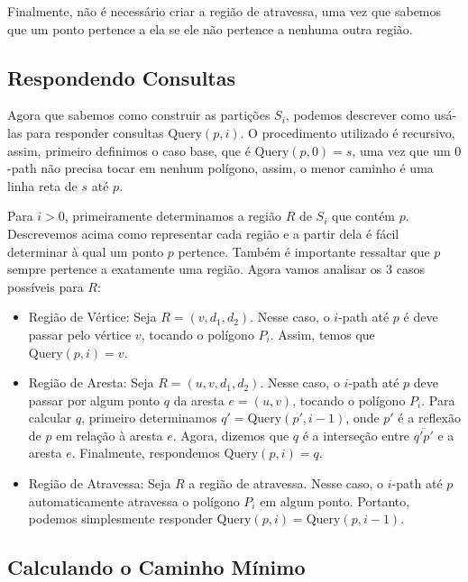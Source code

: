 \documentclass{article}
\begin{document}
Finalmente, não é necessário criar a região de atravessa, uma vez que sabemos que um ponto pertence a ela se ele não pertence a nenhuma outra região.

\subsection{Respondendo Consultas}

Agora que sabemos como construir as partições \(S_i\), podemos descrever como usá-las para responder consultas \(\text{Query}(p, i)\). O procedimento utilizado é recursivo, assim, primeiro definimos o caso base, que é \(\text{Query}(p, 0) = s\), uma vez que um \(0\)-path não precisa tocar em nenhum polígono, assim, o menor caminho é uma linha reta de \(s\) até \(p\).

Para \(i > 0\), primeiramente determinamos a região \(R\) de \(S_i\) que contém \(p\). Descrevemos acima como representar cada região e a partir dela é fácil determinar à qual um ponto \(p\) pertence. Também é importante ressaltar que \(p\) sempre pertence a exatamente uma região. Agora vamos analisar os 3 casos possíveis para \(R\):

\begin{itemize}

	\item Região de Vértice: Seja \(R = (v, d_1, d_2)\). Nesse caso, o \(i\)-path até \(p\) é deve passar pelo vértice \(v\), tocando o polígono \(P_i\). Assim, temos que \(\text{Query}(p, i) = v\).
	
	\item Região de Aresta: Seja \(R = (u, v, d_1, d_2)\). Nesse caso, o \(i\)-path até \(p\) deve passar por algum ponto \(q\) da aresta \(e = (u, v)\), tocando o polígono \(P_i\). Para calcular \(q\), primeiro determinamos \(q' = \text{Query}(p', i - 1)\), onde \(p'\) é a reflexão de \(p\) em relação à aresta \(e\). 
	Agora, dizemos que \(q\) é a interseção entre \(\overline{q'p'}\) e a aresta \(e\). Finalmente, respondemos \(\text{Query}(p, i) = q\).

	\item Região de Atravessa: Seja \(R\) a região de atravessa. Nesse caso, o \(i\)-path até \(p\) automaticamente atravessa o polígono \(P_i\) em algum ponto. Portanto, podemos simplesmente responder \(\text{Query}(p, i) = \text{Query}(p, i - 1)\).

\end{itemize}

\subsection{Calculando o Caminho Mínimo}
\end{document}
